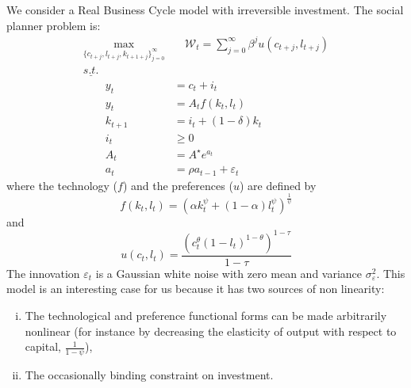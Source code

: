 \documentclass[a4paper,11pt]{amsart}
\begin{document}
We consider a Real Business Cycle model with irreversible investment. The social planner problem is:
\begin{equation*}
   \begin{split}
      \max_{\{c_{t+j},l_{t+j},k_{t+1+j}\}_{j=0}^{\infty}} & \quad \mathcal W_t = \sum_{j=0}^{\infty}\beta^ju(c_{t+j},l_{t+j}) \\
      \underline{s.t.}                                    &                                                                   \\
      \qquad y_t                                          & = c_t + i_t                                                       \\
      \qquad y_t                                          & = A_tf(k_t,l_t)                                                   \\
      \qquad k_{t+1}                                      & = i_t + (1-\delta)k_t                                             \\
      \qquad i_t                                          & \geq 0                                                            \\
      \qquad A_{t}                                        & = {A^{\star}}e^{a_{t}}                                            \\
      \qquad a_{t}                                        & = \rho a_{t-1} + \varepsilon_t
   \end{split}
\end{equation*}
where the technology ($f$) and the preferences ($u$) are defined by
\begin{equation*}
   f(k_t,l_t) = \left(\alpha k_t^{\psi} + (1-\alpha)l_t^{\psi}\right)^{\frac{1}{\psi}}
\end{equation*}
and
\begin{equation*}
   u(c_t,l_t) = \frac{\left(c_t^{\theta}(1-l_t)^{1-\theta}\right)^{1-\tau}}{1-\tau}
\end{equation*}
The innovation $\varepsilon_t$ is a Gaussian white noise with zero mean and
variance $\sigma_{\varepsilon}^2$. This model is an interesting case for
us because it has two sources of non linearity:
\begin{enumerate}[(i)]
   \item The technological and preference functional forms can be made arbitrarily nonlinear (for instance by decreasing the elasticity of output with respect to capital, $\frac{1}{1-\psi}$),
   \item The occasionally binding constraint on investment.
\end{enumerate}
\end{document}
